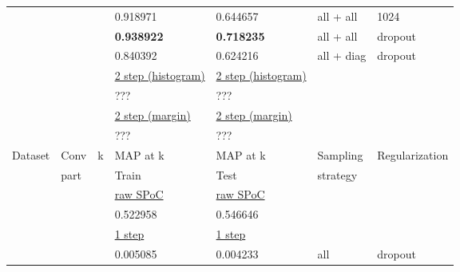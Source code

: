 \documentclass[a4paper,12pt]{extreport}
\begin{document}
\begin{longtable}[h!]{|l|l|l|l|l|l|l|}
            & & & 0.918971 & 0.644657 & all + all & 1024 \\
            & & & \textbf{0.938922} & \textbf{0.718235} & all + all & dropout              \\
            & & & 0.840392 & 0.624216 & all + diag & dropout              \\ \cline{4-7}
            & & & \underline{2 step (histogram)} & \underline{2 step (histogram)} & &                      \\
            & & & ??? & ??? & &                      \\ \cline{4-7}
            & & & \underline{2 step (margin)}    & \underline{2 step (margin)}    & &                      \\
            & & & ??? & ??? & &                      \\ \hline \hline
            Dataset & Conv & k & MAP at k & MAP at k & Sampling & Regularization       \\
            & part & & Train & Test & strategy &                      \\ \hline
            & & & \underline{raw SPoC} & \underline{raw SPoC} & &                      \\
            & & & 0.522958 & 0.546646 & &                      \\\cline{4-7}
            & & & \underline{1 step}   & \underline{1 step}   & &                      \\
            & & & 0.005085 & 0.004233 & all & dropout                  \\ \cline{4-7}


\end{longtable}
\end{document}
